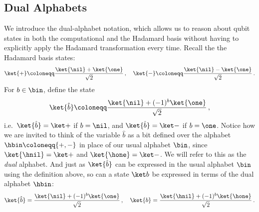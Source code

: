   \subsection{Dual Alphabets}
    We introduce the dual-alphabet notation, which allows us to reason about qubit
      states in both the computational and the Hadamard basis without having to
      explicitly apply the Hadamard transformation every time.
      Recall the the Hadamard basis states: 
      \[
        \ket{+} \coloneqq \frac{\ket{\nil} + \ket{\one}}{\sqrt{2}}\, ,\quad
        \ket{-} \coloneqq \frac{\ket{\nil} - \ket{\one}}{\sqrt{2}}\, .
      \]
      For $b \in \bin$, define the state
      \[
        \ket{\hat{b}} \coloneqq \frac{\ket{\nil} + (-1)^b \ket{\one}}{\sqrt 2}\, ,
      \]
      i.e.\ $\ket{\hat{b}} = \ket +$ if $b=\nil$, and $\ket{\hat{b}} = \ket -$ if
      $b=\one$. Notice how we are invited to think of the variable $\hat{b}$ as a bit
      defined over the alphabet $\hbin \coloneqq \{+,-\}$ in place
      of our usual alphabet $\bin$, since $\ket{\hnil} = \ket +$ and 
      $\ket{\hone} = \ket -$. We will refer to this as the \emph{dual} alphabet.
      And just as $\ket{\hat{b}}$ can be expressed in the usual alphabet $\bin$
      using the definition above, so can a state $\ket b$ be expressed in terms
      of the dual alphabet $\hbin$:
      \[
        \ket{\hat{b}} = \frac{\ket{\nil} + (-1)^b \ket{\one}}{\sqrt 2}\, ,
        \quad
        \ket{b} = \frac{\ket{\hnil} + (-1)^b \ket{\hone}}{\sqrt 2}\, .
      \]


